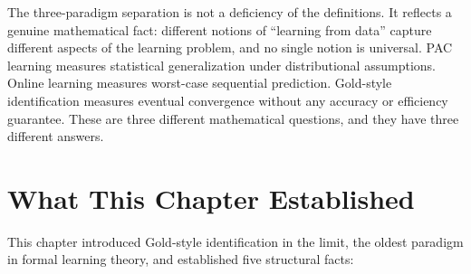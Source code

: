\begin{remark}
\label{rmk:separation-meaning}
The three-paradigm separation is not a deficiency of the definitions. It reflects a genuine mathematical fact: different notions of ``learning from data'' capture different aspects of the learning problem, and no single notion is universal. PAC learning measures statistical generalization under distributional assumptions. Online learning measures worst-case sequential prediction. Gold-style identification measures eventual convergence without any accuracy or efficiency guarantee. These are three different mathematical questions, and they have three different answers.
\end{remark}


\section{What This Chapter Established}
\label{sec:ch7-summary}

This chapter introduced Gold-style identification in the limit, the oldest paradigm in formal learning theory, and established five structural facts:

